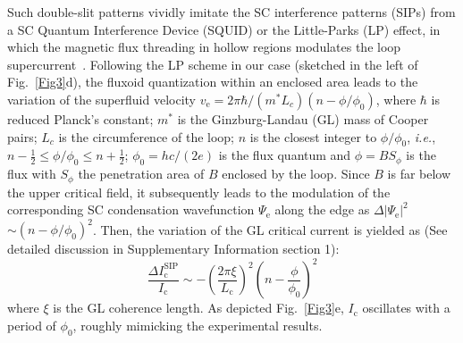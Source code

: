 \documentclass[article,reprint,amsmath,amssymb,superscriptaddress,longbibliography]{revtex4-1}
\begin{document}
Such double-slit patterns vividly imitate the SC interference patterns (SIPs) from a SC Quantum Interference Device (SQUID) or the Little-Parks (LP) effect, in which the magnetic flux threading in hollow regions modulates the loop supercurrent~\cite{Barone1982book}. 
Following the LP scheme in our case (sketched in the left of Fig.~\ref{Fig3}d), the fluxoid quantization within an enclosed area leads to the variation of the superfluid velocity
$v_\textrm{e}=2\pi\hbar/(m^*L_c)(n-\phi/\phi_0)$, where $\hbar$ is reduced Planck's constant;
$m^*$ is the Ginzburg-Landau (GL) mass of Cooper pairs; $L_c$ is the circumference of the loop;
$n$ is the closest integer to $\phi/\phi_0$, {\it i.e.}, $n-\frac{1}{2}\leq \phi/\phi_0 \leq n+\frac{1}{2}$; $\phi_0=hc/(2e)$ is the flux quantum and $\phi=B S_{\phi}$ is the flux with $S_{\phi}$ the penetration area of $B$ enclosed by the loop. Since $B$ is far below the upper critical field, it subsequently leads to the modulation of the corresponding 
SC condensation wavefunction $\Psi_\textrm{e}$ along the edge
as $\Delta |\Psi_\textrm{e}|^2$$\sim(n-\phi/\phi_0)^2$. Then, the variation of the GL critical current is yielded as (See detailed discussion in Supplementary Information section 1):
\begin{equation}
		\frac{\Delta I^\textrm{SIP}_\textrm{c}}{I_\textrm{c}} \sim -\left(\frac{2\pi\xi}{L_\textrm{c}}\right)^2
		\left(n-\frac{\phi}{\phi_0}\right)^2   
	\label{Eq1}
\end{equation}
where $\xi$ is the GL coherence length. As depicted Fig.~\ref{Fig3}e, $I_\textrm{c}$ oscillates with a period of $\phi_0$, roughly mimicking the experimental results. 
\end{document}
